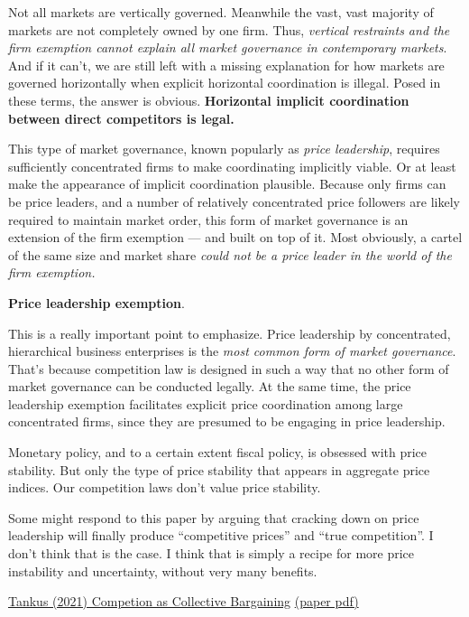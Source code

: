 \documentclass[
]{book}
\begin{document}
Not all markets are vertically governed. Meanwhile the vast, vast majority of markets are not completely owned by one firm. Thus, \emph{vertical restraints and the firm exemption cannot explain all market governance in contemporary markets}. And if it can't, we are still left with a missing explanation for how markets are governed horizontally when explicit horizontal coordination is illegal. Posed in these terms, the answer is obvious. \textbf{Horizontal implicit coordination between direct competitors is legal.}

This type of market governance, known popularly as \emph{price leadership}, requires sufficiently concentrated firms to make coordinating implicitly viable. Or at least make the appearance of implicit coordination plausible. Because only firms can be price leaders, and a number of relatively concentrated price followers are likely required to maintain market order, this form of market governance is an extension of the firm exemption --- and built on top of it. Most obviously, a cartel of the same size and market share \emph{could not be a price leader in the world of the firm exemption.}

\textbf{Price leadership exemption}.

This is a really important point to emphasize. Price leadership by concentrated, hierarchical business enterprises is the \emph{most common form of market governance}. That's because competition law is designed in such a way that no other form of market governance can be conducted legally. At the same time, the price leadership exemption facilitates explicit price coordination among large concentrated firms, since they are presumed to be engaging in price leadership.

Monetary policy, and to a certain extent fiscal policy, is obsessed with price stability. But only the type of price stability that appears in aggregate price indices. Our competition laws don't value price stability.

Some might respond to this paper by arguing that cracking down on price leadership will finally produce ``competitive prices'' and ``true competition''. I don't think that is the case. I think that is simply a recipe for more price instability and uncertainty, without very many benefits.

\href{https://www.crisesnotes.com/competition-law-as-collective-bargaining-law-published-paper-preview/}{Tankus (2021) Competion as Collective Bargaining}
\href{pdf/Tankus_2021_Competion_Bargaining.pdf}{(paper pdf)}
\end{document}
